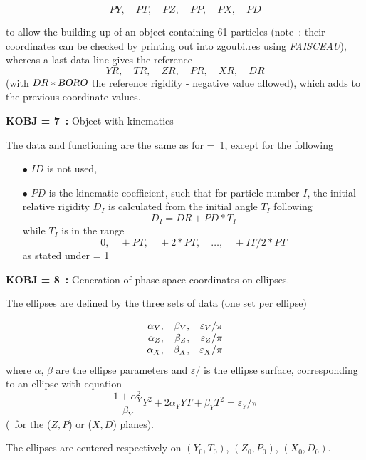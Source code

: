 $$ PY,\quad PT,\quad PZ,\quad PP, \quad PX, \quad PD $$
 
 \noindent to allow the building up of an object containing 61 particles (note~: their coordinates can be 
checked by printing out into zgoubi.res using \textsl{FAISCEAU}), whereas   a last data line gives  the reference 
$$YR, \quad TR, \quad ZR, \quad PR, \quad XR, \quad DR $$
(with $ DR\ast \textsl{BORO}$  the reference rigidity - negative value allowed), which adds to the previous 
 coordinate values.


\bigskip


\noindent\textbf{KOBJ = 7~:} Object with kinematics 

\noindent The data and functioning are the same as for \mbox{\KOBJ= 1}, except for the 
following  
\begin{itemize}
\item[$\bullet$]  $ ID $ is not used,  
\item[$\bullet$]  $ PD $ is the kinematic coefficient, such that for particle
number $ I$,  the initial relative rigidity $ D_I $ is calculated from the initial angle 
$T_I $ following
$$ D_I = DR+ PD \ast  T_I $$
 while $ T_I $ is in the range
$$ 0,\quad \pm PT,\quad \pm 2\ast PT,\quad \ldots,\quad \pm IT/2\ast PT $$
 as stated under \KOBJ = 1
\end{itemize}

\bigskip


\noindent\textbf{KOBJ = 8~:} Generation of phase-space coordinates on ellipses. 

\noindent The ellipses are defined by  the three sets of data (one set per 
  ellipse) 

$$
\begin{array}{*{2}{r<{,}}r}
 \alpha_ Y  &   \beta_ Y  
            &  \varepsilon_Y / \pi \\
\alpha_ Z   &  \beta_ Z  
            &  \varepsilon_Z / \pi \\
\alpha_ X   & \beta_ X 
            &  \varepsilon_X / \pi 
\end{array}           
$$            
%
where $\alpha$, $\beta$ are the ellipse parameters  and $\varepsilon/$ is the 
ellipse surface, corresponding to an ellipse with equation 
$$\dfrac{1 + \alpha^2_Y}{\beta_Y} Y^2 + 2 \alpha_Y YT + \beta_Y T^2 = \varepsilon_Y / \pi$$ 
\noindent (\id\ for the ($Z, P$) or ($X, D$) planes). 

\medskip

\noindent The ellipses are centered respectively on $(Y_0, T_0)$, $(Z_0, P_0)$, $(X_0, D_0)$.  

